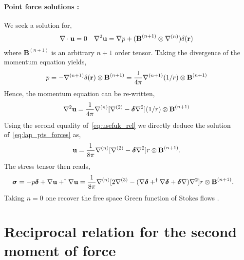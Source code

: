 \paragraph{Point force solutions :} We seek a solution for,
\begin{align}
    \mathbf{\nabla}\cdot\textbf{u}= 0 
    &&
    \mathbf{\nabla}^2\textbf{u}=\mathbf{\nabla} p+ (\textbf{B}^{(n+1)}\otimes \mathbf{\nabla}^{(n)})\delta(\textbf{r})
\end{align}
where $\textbf{B}^{(n+1)}$ is an arbitrary $n+1$ order tensor. 
Taking the divergence of the momentum equation yields, 
\begin{align}
    p = - \mathbf{\nabla}^{(n+1)} \delta(\textbf{r})\otimes \textbf{B}^{(n+1)}
    = \frac{1}{4\pi} \mathbf{\nabla}^{(n+1)} (1/r)\otimes \textbf{B}^{(n+1)}
\end{align}
Hence, the momentum equation can be re-written, 
\begin{align}
    \grad^2\textbf{u}
    =  \frac{1}{4\pi} \grad^{(n)}[\grad^{(2)} - \bm\delta \grad^2](1/r)
    \otimes \textbf{B}^{(n+1)}
    \label{eq:lap_pts_forces}
\end{align}
Using the second equality of~\ref{eq:usefuk_rel} we directly deduce the solution of~\ref{eq:lap_pts_forces} as,
\begin{equation}
    \textbf{u}= 
    \frac{1}{8\pi} \grad^{(n)}[\grad^{(2)} - \bm\delta \grad^2] r\otimes \textbf{B}^{(n+1)}. 
    \label{eq:point_force}
\end{equation}
The stress tensor then reads,
\begin{align}
    \bm\sigma
    =
    - p \bm\delta
    + \mathbf{\nabla} \textbf{u}
    + ^\dagger \mathbf{\nabla} \textbf{u}
    &=
    \frac{1}{8\pi}\mathbf{\nabla}^{(n)}[2\mathbf{\nabla}^{(3)} - (\mathbf{\nabla}\bm\delta + ^\dagger\mathbf{\nabla}\bm\delta+\bm\delta\mathbf{\nabla}) \mathbf{\nabla}^2] r\otimes \textbf{B}^{(n+1)}.
\end{align}
Taking $n=0$ one recover the free space Green function of Stokes flows \citep{pozrikidis2011introduction}. 

\section{Reciprocal relation for the second moment of force}
\label{ap:second_mom}

